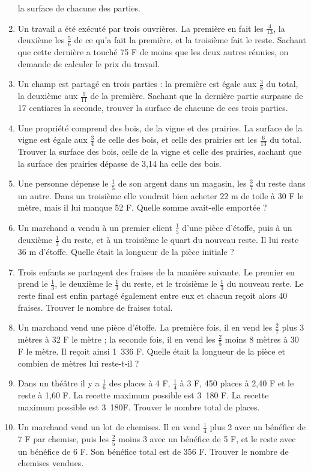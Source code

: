 \documentclass[12 pt]{report}
\theoremstyle{plain}
\newcounter{n}
\begin{document}
\begin{enumerate}
 la surface de chacune des parties. 
 \item Un travail a été exécuté par trois ouvrières. La première en fait les $\frac4{13}$, la deuxième les $\frac56$ de ce qu'a fait la 
 première, et la troisième fait le reste. Sachant que cette dernière a touché 75 F de moins que les deux autres réunies, on demande de calculer le prix du travail.
 \item Un champ est partagé en trois parties : la première est égale aux $\frac38$ du total, la deuxième aux $\frac9{11}$ de la première. Sachant que la dernière partie surpasse de 17 centiares la seconde, trouver la surface de chacune de ces trois parties.
 \item Une propriété comprend des bois, de la vigne et des prairies. La surface de la vigne est égale aux $\frac34$ de celle des bois, et celle des prairies est les $\frac6{13}$ du total. Trouver la surface des bois, celle de la vigne et celle des prairies, sachant que la surface des prairies dépasse de 3,14 ha celle des bois. 
 \item Une personne dépense le $\frac15$ de son argent dans un magasin, les $\frac37$ du reste dans un autre. Dans un troisième elle voudrait bien acheter $22$ m de toile à 30 F le mètre, mais il lui manque 52 F. Quelle somme avait-elle emportée ?
 \item Un marchand a vendu à un premier client $\frac15$ d'une pièce d'étoffe, puis à un deuxième $\frac13$ du reste, et à un troisième le quart du nouveau reste. Il lui reste 36 m d'étoffe. Quelle était la longueur de la pièce initiale ? 
 \item Trois enfants se partagent des fraises de la manière suivante. Le premier en prend le $\frac13$, le deuxième le $\frac13$ du reste, et le troisième le $\frac13$ du nouveau reste. Le reste final est enfin partagé également entre eux et chacun reçoit alors 40 fraises. Trouver le nombre de fraises total. 
 \item Un marchand vend une pièce d'étoffe. La première fois, il en vend les $\frac27$ plus 3 mètres à 32 F le mètre ; la seconde fois, il en vend les $\frac25$ moins 8 mètres à 30 F le mètre. Il reçoit ainsi 1~336 F. Quelle était la longueur de la pièce et combien de 
 mètres lui reste-t-il ? 
 \item Dans un théâtre il y a $\frac16$ des places à 4 F, $\frac14$ à 3 F, 450 places à 2,40 F et le reste à 1,60 F. La recette maximum
 possible est 3~180 F. La recette maximum possible est 3~180F. Trouver le nombre total de places. 
 \item Un marchand vend un lot de chemises. Il en vend $\frac14$ plus 2 avec un bénéfice de 7 F par chemise, puis les $\frac25$ moins 3 avec un bénéfice de 5 F, et le reste avec un bénéfice de 6 F. Son bénéfice total est de 356 F. Trouver le nombre de chemises vendues. 

\end{enumerate}
\end{document}
